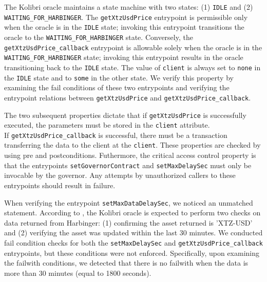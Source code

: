 \documentclass[runningheads]{llncs}
\begin{document}
The Kolibri oracle maintains a state machine with two states: (1) \lstinline/IDLE/ and (2) \lstinline/WAITING_FOR_HARBINGER/. The \lstinline/getXtzUsdPrice/ entrypoint is permissible only when the oracle is in the \lstinline/IDLE/ state; invoking this entrypoint transitions the oracle to the \lstinline/WAITING_FOR_HARBINGER/ state. Conversely, the\\ \lstinline/getXtzUsdPrice_callback/ entrypoint is allowable solely when the oracle is in the \lstinline/WAITING_FOR_HARBINGER/ state; invoking this entrypoint results in the oracle transitioning back to the \lstinline/IDLE/ state. The value of \lstinline/client/ is always set to \lstinline/none/ in the \lstinline/IDLE/ state and to \lstinline/some/ in the other state. We verify this property by examining the fail conditions of these two entrypoints and verifying the entrypoint relations between \lstinline/getXtzUsdPrice/ and \lstinline/getXtzUsdPrice_callback/.

The two subsequent properties dictate that if \lstinline/getXtzUsdPrice/ is successfully executed, the parameters must be stored in the \lstinline/client/ attribute. \\ If \lstinline/getXtzUsdPrice_callback/ is successful, there must be a transaction transferring the data to the client at the \lstinline/client/. These properties are checked by using pre and postconditions. Futhermore, the critical access control property is that the entrypoints \lstinline/setGovernorContract/ and \lstinline/setMaxDelaySec/ must only be invocable by the governor. Any attempts by unauthorized callers to these entrypoints should result in failure.

When verifying the entrypoint \lstinline/setMaxDataDelaySec/, we noticed an unmatched statement. According to \cite{kolibri}, the Kolibri oracle is expected to perform two checks on data returned from Harbinger: (1) confirming the asset returned is 'XTZ-USD' and (2) verifying the asset was updated within the last 30 minutes. We conducted fail condition checks for both the \lstinline/setMaxDelaySec/ and \lstinline/getXtzUsdPrice_callback/ entrypoints, but these conditions were not enforced. Specifically, upon examining the failwith conditions, we detected that there is no failwith when the data is more than 30 minutes (equal to 1800 seconds). 
\end{document}
